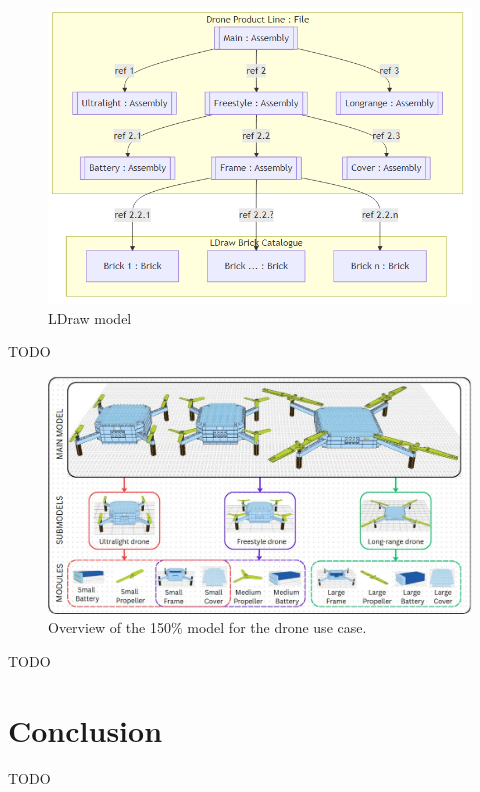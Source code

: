\documentclass[sigconf,review]{acmart}
\begin{document}
\begin{figure}[htbp]
    \includegraphics[width=\columnwidth]{./ldraw-model.png}
    \caption{LDraw model}
    \label{fig:ldraw-model}
\end{figure}

TODO

\begin{figure}[htbp]
    \includegraphics[width=\textwidth]{./150_MODEL_6.jpg}
    \caption{Overview of the 150\% model for the drone use case.}
    \label{fig:150-model}
\end{figure}

TODO

\section{Conclusion}
\label{sec:conclusion}

TODO



\end{document}
